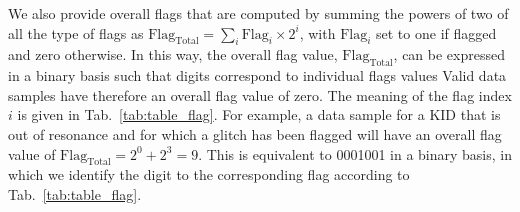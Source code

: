 \documentclass[a4paper,10pt]{article}
\begin{document}
	We also provide overall flags that are computed by summing the powers
        of two of all the type of flags as $\mathrm{Flag}_{\mathrm{Total}} =
        \sum_i \mathrm{Flag}_i \times 2^i$, with $\mathrm{Flag}_i$ set to one
        if flagged and zero otherwise. In this way, the overall flag value,
        $\mathrm{Flag}_{\mathrm{Total}}$, can be expressed in a binary basis
        such that digits correspond to individual flags values Valid data
        samples have therefore an overall flag value of zero. The meaning of
        the flag index $i$ is given in Tab.~\ref{tab:table_flag}. For example,
        a data sample for a KID that is out of resonance and for which a
        glitch has been flagged will have an overall flag value of
        $\mathrm{Flag}_{\mathrm{Total}} = 2^0 + 2^3 = 9$. This is equivalent
        to 0001001 in a binary basis, in which we identify the digit to the
        corresponding flag according to Tab.~\ref{tab:table_flag}.
\end{document}
